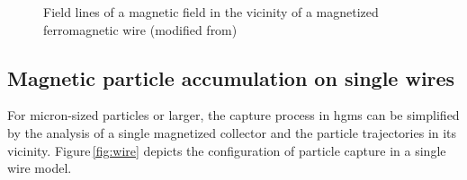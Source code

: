 \begin{figure}[H]
\centering
{}
\caption[Magnetic field in the vicinity of a wire]{Field lines of a magnetic field in the vicinity of a magnetized ferromagnetic wire (modified from\cite{FranzrebHabil})
\label{fig:mag_field_wire}
}
\end{figure}


\subsection{Magnetic particle accumulation on single wires}
\label{subsec:single_wire}
For micron-sized particles or larger, the capture process in \gls{hgms} can be simplified by the analysis of a single magnetized collector and the particle trajectories in its vicinity. Figure\,\ref{fig:wire} depicts the configuration of particle capture in a single wire model.

